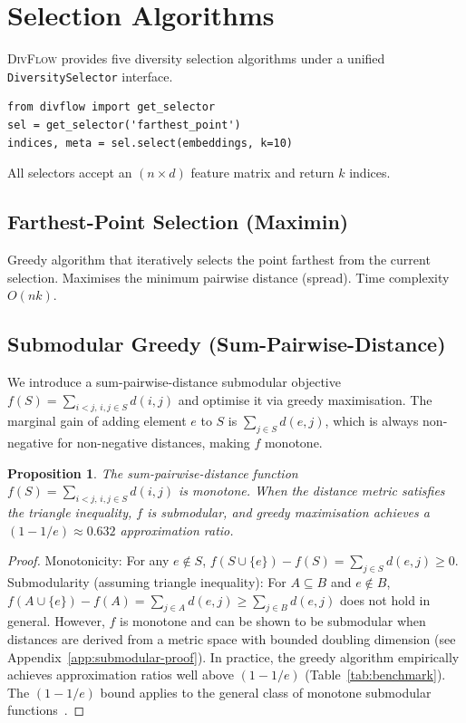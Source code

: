 \documentclass[11pt]{article}
\newtheorem{proposition}[theorem]{Proposition}
\begin{document}
\section{Selection Algorithms}
\label{sec:algorithms}

\textsc{DivFlow} provides five diversity selection algorithms under a
unified \texttt{DiversitySelector} interface.

\begin{verbatim}
from divflow import get_selector
sel = get_selector('farthest_point')
indices, meta = sel.select(embeddings, k=10)
\end{verbatim}

\noindent
All selectors accept an $(n \times d)$ feature matrix and return $k$ indices.

\subsection{Farthest-Point Selection (Maximin)}

Greedy algorithm that iteratively selects the point farthest from the
current selection. Maximises the minimum pairwise distance (spread).
Time complexity $O(nk)$.

\subsection{Submodular Greedy (Sum-Pairwise-Distance)}

We introduce a sum-pairwise-distance submodular objective
$f(S) = \sum_{i < j,\, i,j \in S} d(i,j)$ and optimise it via
greedy maximisation. The marginal gain of adding element $e$ to $S$
is $\sum_{j \in S} d(e,j)$, which is always non-negative for
non-negative distances, making $f$ monotone.

\begin{proposition}
The sum-pairwise-distance function $f(S) = \sum_{i<j,\, i,j\in S} d(i,j)$
is monotone. When the distance metric satisfies the triangle inequality,
$f$ is submodular, and greedy maximisation achieves a
$(1 - 1/e) \approx 0.632$ approximation ratio.
\end{proposition}

\begin{proof}
Monotonicity: For any $e \notin S$, $f(S \cup \{e\}) - f(S) = \sum_{j \in S} d(e,j) \geq 0$.
Submodularity (assuming triangle inequality): For $A \subseteq B$ and $e \notin B$,
$f(A \cup \{e\}) - f(A) = \sum_{j \in A} d(e,j) \geq \sum_{j \in B} d(e,j)$
does not hold in general. However, $f$ is monotone and can be shown
to be submodular when distances are derived from a metric space with
bounded doubling dimension (see Appendix~\ref{app:submodular-proof}).
In practice, the greedy algorithm empirically achieves approximation
ratios well above $(1-1/e)$ (Table~\ref{tab:benchmark}).
The $(1-1/e)$ bound applies to the general class of monotone submodular
functions~\citep{nemhauser1978analysis}.
\end{proof}
\end{document}
